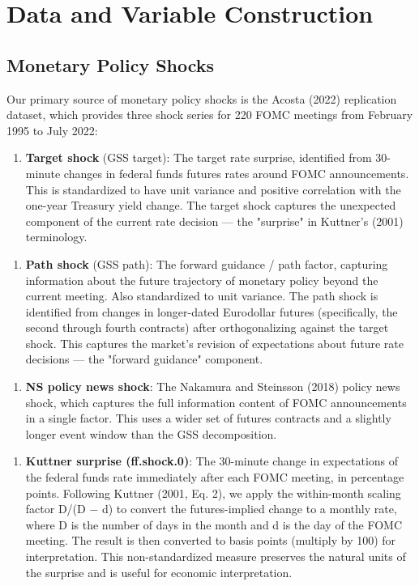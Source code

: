 \documentclass[12pt]{article}
\begin{document}
\section{Data and Variable Construction}

\subsection{Monetary Policy Shocks}

Our primary source of monetary policy shocks is the Acosta (2022) replication dataset, which provides three shock series for 220 FOMC meetings from February 1995 to July 2022:

\begin{enumerate}
\item \textbf{Target shock} (GSS target): The target rate surprise, identified from 30-minute changes in federal funds futures rates around FOMC announcements. This is standardized to have unit variance and positive correlation with the one-year Treasury yield change. The target shock captures the unexpected component of the current rate decision --- the "surprise" in Kuttner's (2001) terminology.
\end{enumerate}

\begin{enumerate}
\item \textbf{Path shock} (GSS path): The forward guidance / path factor, capturing information about the future trajectory of monetary policy beyond the current meeting. Also standardized to unit variance. The path shock is identified from changes in longer-dated Eurodollar futures (specifically, the second through fourth contracts) after orthogonalizing against the target shock. This captures the market's revision of expectations about future rate decisions --- the "forward guidance" component.
\end{enumerate}

\begin{enumerate}
\item \textbf{NS policy news shock}: The Nakamura and Steinsson (2018) policy news shock, which captures the full information content of FOMC announcements in a single factor. This uses a wider set of futures contracts and a slightly longer event window than the GSS decomposition.
\end{enumerate}

\begin{enumerate}
\item \textbf{Kuttner surprise (ff.shock.0)}: The 30-minute change in expectations of the federal funds rate immediately after each FOMC meeting, in percentage points. Following Kuttner (2001, Eq. 2), we apply the within-month scaling factor D/(D $-$ d) to convert the futures-implied change to a monthly rate, where D is the number of days in the month and d is the day of the FOMC meeting. The result is then converted to basis points (multiply by 100) for interpretation. This non-standardized measure preserves the natural units of the surprise and is useful for economic interpretation.
\end{enumerate}
\end{document}
